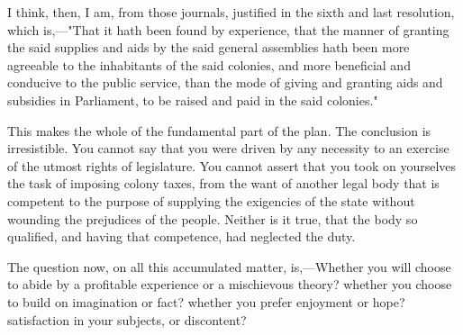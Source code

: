 I think, then, I am, from those journals, justified in the sixth and last resolution, which is,—"That it hath been found by experience, that the manner of granting the said supplies and aids by the said general assemblies hath been more agreeable to the inhabitants of the said colonies, and more beneficial and conducive to the public service, than the mode of giving and granting aids and subsidies in Parliament, to be raised and paid in the said colonies."

This makes the whole of the fundamental part of the plan. The conclusion is irresistible. You cannot say that you were driven by any necessity to an exercise of the utmost rights of legislature. You cannot assert that you took on yourselves the task of imposing colony taxes, from the want of another legal body that is competent to the purpose of supplying the exigencies of the state without wounding the prejudices of the people. Neither is it true, that the body so qualified, and having that competence, had neglected the duty.

The question now, on all this accumulated matter, is,—Whether you will choose to abide by a profitable experience or a mischievous theory? whether you choose to build on imagination or fact? whether you prefer enjoyment or hope? satisfaction in your subjects, or discontent?

